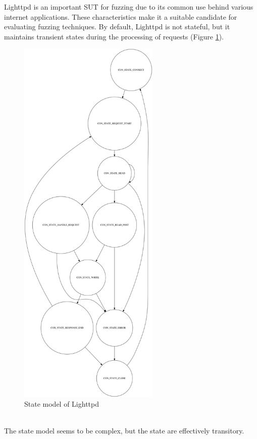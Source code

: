 Lighttpd is an important SUT for fuzzing due to its common use behind various internet applications.
These characteristics make it a suitable candidate for evaluating fuzzing techniques.
By default, Lighttpd is not stateful, but it maintains transient states during the processing of requests (Figure \ref{fig:lighttpdstatemodel}).
\begin{figure}[H]
    \centering
    \includegraphics[width=0.6\textwidth]{Images/lighttpd_original.png}
    \caption{State model of Lighttpd}
    \label{fig:lighttpdstatemodel}
\end{figure}
\phantom{}\\
The state model seems to be complex, but the state are effectively transitory.
